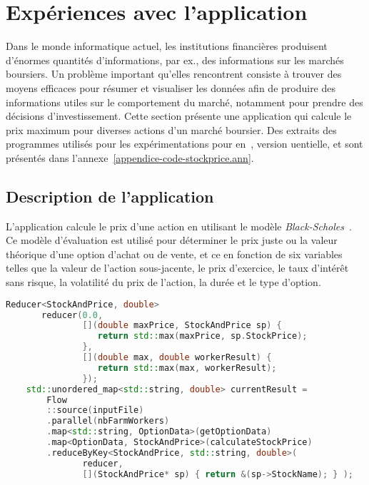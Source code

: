 \section{Expériences avec l'application }
\label{stockprice.sect}

Dans le monde informatique actuel, les institutions financi\`eres produisent d'\'enormes quantit\'es d'informations, par ex., des informations sur les march\'es boursiers. Un probl\`eme important qu'elles rencontrent consiste \`a trouver des moyens efficaces pour r\'esumer et visualiser les donn\'ees afin de produire des informations utiles sur le comportement du march\'e, notamment pour prendre des d\'ecisions d'investissement. Cette section pr\'esente une application qui calcule le prix maximum pour diverses actions d'un marché boursier. Des extraits des programmes utilis\'es pour les exp\'erimentations pour  en~,  version uentielle,  et  sont pr\'esent\'es dans l'annexe~\ref{appendice-code-stockprice.ann}.


\subsection{Description de l'application}

L'application  calcule le prix d'une action en utilisant le modèle \emph{Black-Scholes}~\citep{macbeth1979empirical}. Ce mod\`ele d'\'evaluation est utilis\'e pour d\'eterminer le prix juste ou la valeur th\'eorique d'une option d'achat ou de vente, et ce en fonction de six variables telles que la valeur de l'action sous-jacente, le prix d'exercice, le taux d'int\'er\^et sans risque, la volatilit\'e du prix de l'action, la dur\'ee et le type d'option. 

\begin{lstlisting}[float,label={StockPrice-code.listing},gobble=4,basicstyle=\ttfamily\footnotesize,language=c++,caption={Un extrait du code de \TT{StockPrice.cpp} (version \ppff).},frame=single]
    Reducer<StockAndPrice, double>
       reducer(0.0, 
               [](double maxPrice, StockAndPrice sp) {
                  return std::max(maxPrice, sp.StockPrice);
               },
               [](double max, double workerResult) { 
                  return std::max(max, workerResult);
               });
    std::unordered_map<std::string, double> currentResult =
        Flow
        ::source(inputFile)
        .parallel(nbFarmWorkers)
        .map<std::string, OptionData>(getOptionData)
        .map<OptionData, StockAndPrice>(calculateStockPrice)
        .reduceByKey<StockAndPrice, std::string, double>(
               reducer, 
               [](StockAndPrice* sp) { return &(sp->StockName); } );
\end{lstlisting}



